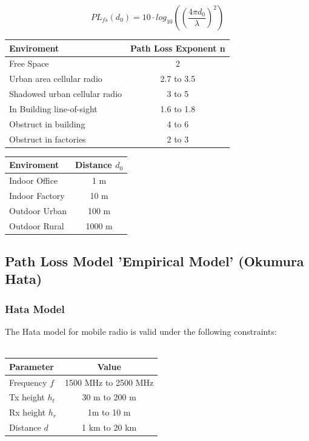 \begin{equation}
	PL_{fs}(d_0) = 10\cdot log_{10}((\frac{4\pi d_0}{\lambda})^2)
\end{equation}

\begin{table}[!htp]
\begin{subtable}[c]{0.6\textwidth}
	\begin{tabular}{|l|c|}
	\hline \textbf{Enviroment} & \textbf{Path Loss Exponent n} \\ \hline
		\hline Free Space & 2 \\ 
		\hline Urban area cellular radio &  2.7 to 3.5\\ 
		\hline Shadowed urban cellular radio &  3 to 5\\ 
		\hline In Building line-of-sight & 1.6 to 1.8 \\ 
		\hline  Obstruct in building& 4 to 6 \\ 
		\hline Obstruct in factories & 2 to 3 \\ 
		\hline 
	\end{tabular}
\end{subtable}
\begin{subtable}[c]{0.4\textwidth}
	\begin{tabular}{|l|c|}
	\hline \textbf{Enviroment} &  \textbf{Distance $d_0$ }\\ \hline
	\hline Indoor Office & 1 m \\ 
	\hline Indoor Factory & 10 m \\ 
	\hline Outdoor Urban & 100 m \\ 
	\hline Outdoor Rural & 1000 m \\ 
	\hline 
	\end{tabular}
\end{subtable}
\end{table}

\subsection{Path Loss Model 'Empirical Model' (Okumura Hata)}
\subsubsection{Hata Model}
The Hata model for mobile radio is valid under the following constraints:\\ \\
\begin{tabular}{|l|c|}
\hline \textbf{Parameter} & \textbf{Value} \\ \hline
\hline Frequency $f$ & 1500 MHz to 2500 MHz \\ 
\hline Tx height $h_t$ & 30 m to 200 m \\ 
\hline Rx height $h_r$ & 1m to 10 m \\ 
\hline Distance $d$ & 1 km to 20 km \\ 
\hline 
\end{tabular} \\ \\

